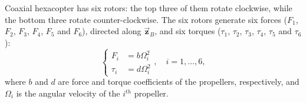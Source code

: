 Coaxial hexacopter has six rotors: the top three of them rotate clockwise, while the bottom three rotate counter-clockwise. The six rotors generate six forces ($F_1$, $F_2$, $F_3$, $F_4$, $F_5$  and $F_6$), directed along $\vec{\mathbf{z}}_B$, and six torques ($\tau_1$, $\tau_2$, $\tau_3$, $\tau_4$, $\tau_5$  and $\tau_6$):
\begin{equation}
\begin{cases}
F_i &= b \Omega_i^2 \\
\tau_i &= d \Omega_i^2
\end{cases}
, \quad i = 1,\ldots, 6,
\label{eq:motors}
\end{equation}
where $b$ and $d$ are force and torque coefficients of the propellers, respectively, and $\Omega_i$ is the angular velocity of the $i^{th}$ propeller.

